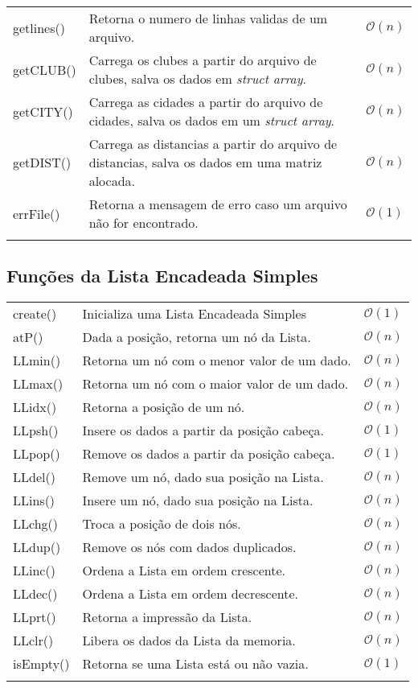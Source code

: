 \documentclass[12pt,a4paper]{article}
\numberwithin{figure}{section}
\numberwithin{table}{section}
\begin{document}
\begin{longtable}{>{\ttfamily}p{3cm} p{11cm} p{1cm}}
	getlines() & Retorna o numero de linhas validas de um arquivo. & $\mathcal{O}(n)$ \\
	getCLUB() & Carrega os clubes a partir do arquivo de clubes, salva os dados em \textit{struct array}. & $\mathcal{O}(n)$ \\
	getCITY() & Carrega as cidades a partir do arquivo de cidades, salva os dados em um \textit{struct array}. & $\mathcal{O}(n)$ \\
	getDIST() & Carrega as distancias a partir do arquivo de distancias, salva os dados em uma matriz alocada. & $\mathcal{O}(n)$ \\
	errFile() & Retorna a mensagem de erro caso um arquivo não for encontrado. & $\mathcal{O}(1)$ \\
	\label{tab:files}
\end{longtable}
\vspace{-0.5cm}

\subsection{Funções da Lista Encadeada Simples}

\begin{longtable}{>{\ttfamily}p{3cm} p{11cm} p{1cm}}
	create() & Inicializa uma Lista Encadeada Simples & $\mathcal{O}(1)$ \\
	atP()   & Dada a posição, retorna um nó da Lista. & $\mathcal{O}(n)$ \\
	LLmin() & Retorna um nó com o menor valor de um dado. & $\mathcal{O}(n)$ \\
	LLmax() & Retorna um nó com o maior valor de um dado. & $\mathcal{O}(n)$ \\
	LLidx() & Retorna a posição de um nó. & $\mathcal{O}(n)$ \\
	LLpsh() & Insere os dados a partir da posição cabeça. & $\mathcal{O}(1)$ \\
	LLpop() & Remove os dados a partir da posição cabeça. & $\mathcal{O}(1)$ \\
	LLdel() & Remove um nó, dado sua posição na Lista. & $\mathcal{O}(n)$ \\
	LLins() & Insere um nó, dado sua posição na Lista. & $\mathcal{O}(n)$ \\
	LLchg() & Troca a posição de dois nós. & $\mathcal{O}(n)$ \\
	LLdup() & Remove os nós com dados duplicados. & $\mathcal{O}(n)$ \\
	LLinc() & Ordena a Lista em ordem crescente. & $\mathcal{O}(n)$ \\
	LLdec() & Ordena a Lista em ordem decrescente. & $\mathcal{O}(n)$ \\
	LLprt() & Retorna a impressão da Lista. & $\mathcal{O}(n)$ \\
	LLclr()  & Libera os dados da Lista da memoria. & $\mathcal{O}(n)$ \\
	isEmpty() & Retorna se uma Lista está ou não vazia. & $\mathcal{O}(1)$ \\
	\label{tab:lista}
\end{longtable}
\vspace{-0.5cm}
\end{document}
